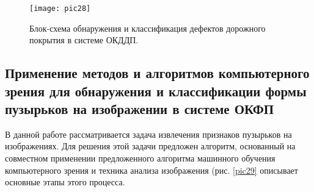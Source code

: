 \documentclass[a4paper,14pt]{extreport}
\begin{document}
\begin{figure}[ht!]
\centering
\texttt{[image: pic28]}
\caption{Блок-схема обнаружения и классификация дефектов дорожного покрытия в системе ОКДДП.}
	\label{pic28}
		\end{figure}

\subsection{Применение методов и алгоритмов компьютерного зрения для обнаружения и классификации формы пузырьков на изображении в системе ОКФП} \label{partd}
В данной работе рассматривается задача извлечения  признаков пузырьков на изображениях. Для решения этой задачи предложен алгоритм, основанный на совместном применении предложенного алгоритма машинного обучения компьютерного зрения и техника анализа изображения (рис. \ref{pic29} описывает основные этапы этого процесса. 
\end{document}
